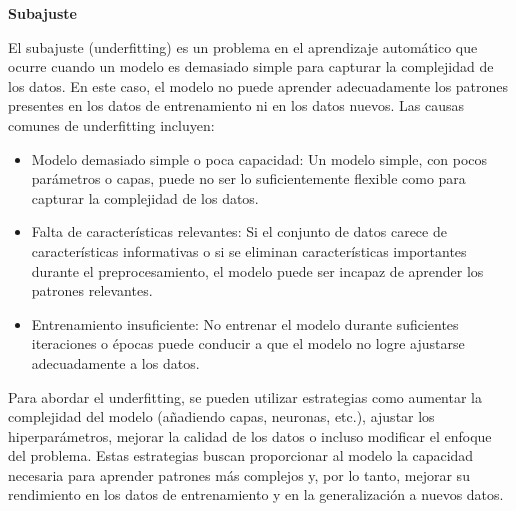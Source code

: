 \textbf{Subajuste}

El subajuste (underfitting) es un problema en el aprendizaje automático que ocurre cuando un modelo es demasiado simple para capturar la complejidad de los datos. En este caso, el modelo no puede aprender adecuadamente los patrones presentes en los datos de entrenamiento ni en los datos nuevos. Las causas comunes de underfitting incluyen:

\begin{itemize}

	\item Modelo demasiado simple o poca capacidad: Un modelo simple, con pocos parámetros o capas, puede no ser lo suficientemente flexible como para capturar la complejidad de los datos.
	
	\item Falta de características relevantes: Si el conjunto de datos carece de características informativas o si se eliminan características importantes durante el preprocesamiento, el modelo puede ser incapaz de aprender los patrones relevantes.
	
	\item Entrenamiento insuficiente: No entrenar el modelo durante suficientes iteraciones o épocas puede conducir a que el modelo no logre ajustarse adecuadamente a los datos.
	
\end{itemize}

Para abordar el underfitting, se pueden utilizar estrategias como aumentar la complejidad del modelo (añadiendo capas, neuronas, etc.), ajustar los hiperparámetros, mejorar la calidad de los datos o incluso modificar el enfoque del problema. Estas estrategias buscan proporcionar al modelo la capacidad necesaria para aprender patrones más complejos y, por lo tanto, mejorar su rendimiento en los datos de entrenamiento y en la generalización a nuevos datos.

	